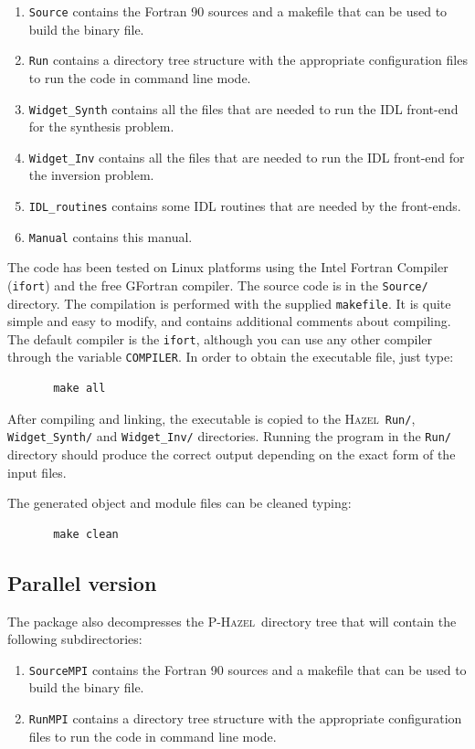\documentclass[12pt]{article}
\def\H{\textsc{Hazel}}
\def\HM{\textsc{P-Hazel}}
\begin{document}
\begin{enumerate}
\item
{\tt Source} contains the Fortran 90 sources and a makefile that can be used
to build the binary file.
\item
{\tt Run} contains a directory tree structure with the appropriate configuration files
to run the code in command line mode.
\item
{\tt Widget\_Synth} contains all the files that are needed to run the IDL front-end
for the synthesis problem.
\item
{\tt Widget\_Inv} contains all the files that are needed to run the IDL front-end
for the inversion problem.  
\item
{\tt IDL\_routines} contains some IDL routines that are needed by the 
front-ends.
\item
{\tt Manual} contains this manual. 
\end{enumerate}

The code has been tested on Linux platforms using the Intel Fortran
Compiler (\texttt{ifort}) and the free GFortran compiler. The
source code is in the \texttt{Source/} directory. The compilation is performed
with the supplied \texttt{makefile}. It is quite simple and easy to modify, and
contains additional comments about compiling. The
default compiler is the \texttt{ifort}, although you can use any other
compiler through the variable \texttt{COMPILER}.
In order to obtain the executable file, just type:
\begin{verbatim}       
       make all
\end{verbatim}
After compiling and linking, the executable is copied to the \H\ \texttt{Run/},
\texttt{Widget\_Synth/} and \texttt{Widget\_Inv/} directories. Running the
program in the \texttt{Run/} directory should produce the correct output 
depending on the exact form of the input files.

The generated object and module files can be cleaned typing:
\begin{verbatim}
       make clean
\end{verbatim}

\subsection{Parallel version}
The package also decompresses the \HM\ directory tree that
will contain the following subdirectories:

\begin{enumerate}
\item
{\tt SourceMPI} contains the Fortran 90 sources and a makefile that can be used
to build the binary file.
\item
{\tt RunMPI} contains a directory tree structure with the appropriate configuration files
to run the code in command line mode.
\end{enumerate}
\end{document}
